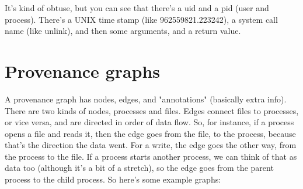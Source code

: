\documentclass{article}
\begin{document}
It's kind of obtuse, but you can see that there's a uid and a pid (user and process). There's a UNIX time stamp (like 962559821.223242), a system call name (like unlink), and then some arguments, and a return value.
\section{Provenance graphs}
A provenance graph has nodes, edges, and "annotations" (basically extra info). There are two kinds of nodes, processes and files. Edges connect files to processes, or vice versa, and are directed in order of data flow. So, for instance, if a process opens a file and reads it, then the edge goes from the file, to the process, because that's the direction the data went. For a write, the edge goes the other way, from the process to the file. If a process starts another process, we can think of that as data too (although it's a bit of a stretch), so the edge goes from the parent process to the child process. So here's some example graphs:
\end{document}
